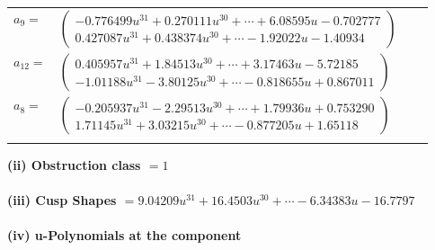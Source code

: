 \documentclass[1p]{elsarticle_modified}
\theoremstyle{definition}
\begin{document}
\begin{tabular}{m{7pt} m{180pt} m{7pt} m{180pt} }
\flushright $a_{9}=$&$\begin{pmatrix}-0.776499 u^{31}+0.270111 u^{30}+\cdots+6.08595 u-0.702777\\0.427087 u^{31}+0.438374 u^{30}+\cdots-1.92022 u-1.40934\end{pmatrix}$ \\
\flushright $a_{12}=$&$\begin{pmatrix}0.405957 u^{31}+1.84513 u^{30}+\cdots+3.17463 u-5.72185\\-1.01188 u^{31}-3.80125 u^{30}+\cdots-0.818655 u+0.867011\end{pmatrix}$ \\
\flushright $a_{8}=$&$\begin{pmatrix}-0.205937 u^{31}-2.29513 u^{30}+\cdots+1.79936 u+0.753290\\1.71145 u^{31}+3.03215 u^{30}+\cdots-0.877205 u+1.65118\end{pmatrix}$\\&\end{tabular}
\flushleft \textbf{(ii) Obstruction class $= 1$}\\~\\
\flushleft \textbf{(iii) Cusp Shapes $= 9.04209 u^{31}+16.4503 u^{30}+\cdots-6.34383 u-16.7797$}\\~\\
\newpage\renewcommand{\arraystretch}{1}
\flushleft \textbf{(iv) u-Polynomials at the component}\newline \\
\end{document}
